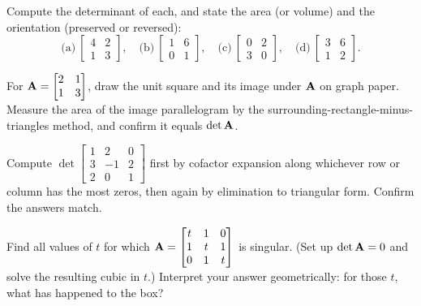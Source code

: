 \begin{exercise}
\label{ch21:ex-warmup}
Compute the determinant of each, and state the area (or volume) and the
orientation (preserved or reversed):
\[
  \text{(a)}\ \begin{bmatrix} 4 & 2 \\ 1 & 3 \end{bmatrix},\quad
  \text{(b)}\ \begin{bmatrix} 1 & 6 \\ 0 & 1 \end{bmatrix},\quad
  \text{(c)}\ \begin{bmatrix} 0 & 2 \\ 3 & 0 \end{bmatrix},\quad
  \text{(d)}\ \begin{bmatrix} 3 & 6 \\ 1 & 2 \end{bmatrix}.
\]
\end{exercise}

\begin{exercise}
\label{ch21:ex-draw}
For $\mathbf{A} = \begin{bmatrix} 2 & 1 \\ 1 & 3 \end{bmatrix}$, draw the unit square
and its image under $\mathbf{A}$ on graph paper. Measure the area of the image
parallelogram by the surrounding-rectangle-minus-triangles method, and confirm it
equals $\det\mathbf{A}$.
\end{exercise}

\begin{exercise}
\label{ch21:ex-3x3-two-ways}
Compute $\det\begin{bmatrix} 1 & 2 & 0 \\ 3 & -1 & 2 \\ 2 & 0 & 1 \end{bmatrix}$
first by cofactor expansion along whichever row or column has the most zeros, then
again by elimination to triangular form. Confirm the answers match.
\end{exercise}

\begin{exercise}
\label{ch21:ex-singular}
Find all values of $t$ for which
$\mathbf{A} = \begin{bmatrix} t & 1 & 0 \\ 1 & t & 1 \\ 0 & 1 & t \end{bmatrix}$
is singular. (Set up $\det\mathbf{A} = 0$ and solve the resulting cubic in $t$.)
Interpret your answer geometrically: for those $t$, what has happened to the box?
\end{exercise}

